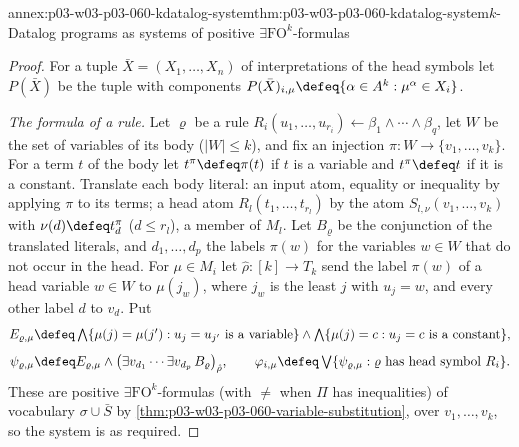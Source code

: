 \begin{annexitem}{annex:p03-w03-p03-060-kdatalog-system}{thm:p03-w03-p03-060-kdatalog-system}{\(k\)-Datalog programs as systems of positive \(\exists\mathrm{FO}^k\)-formulas}
\begin{proof}
For a tuple \(\bar X=(X_1,\ldots,X_n)\) of interpretations of the head
symbols let \(P(\bar X)\) be the tuple with components
\(P(\bar X)_{i,\mu}\defeq\{\alpha\in A^k:\mu^\alpha\in X_i\}\).

\emph{The formula of a rule.} Let \(\varrho\) be a rule
\(R_i(u_1,\ldots,u_{r_i})\leftarrow\beta_1\wedge\cdots\wedge\beta_q\), let
\(W\) be the set of variables of its body (\(|W|\le k\)), and fix an
injection \(\pi\colon W\to\{v_1,\ldots,v_k\}\). For a term \(t\) of the
body let \(t^\pi\defeq\pi(t)\) if \(t\) is a variable and \(t^\pi\defeq t\)
if it is a constant. Translate each body literal: an input atom, equality
or inequality by applying \(\pi\) to its terms; a head atom
\(R_l(t_1,\ldots,t_{r_l})\) by the atom \(S_{l,\nu}(v_1,\ldots,v_k)\) with
\(\nu(d)\defeq t_d^\pi\) (\(d\le r_l\)), a member of \(M_l\). Let
\(B_\varrho\) be the conjunction of the translated literals, and
\(d_1,\ldots,d_p\) the labels \(\pi(w)\) for the variables \(w\in W\) that
do not occur in the head. For \(\mu\in M_i\) let \(\hat\rho\colon[k]\to T_k\)
send the label \(\pi(w)\) of a head variable \(w\in W\) to \(\mu(j_w)\),
where \(j_w\) is the least \(j\) with \(u_j=w\), and every other label
\(d\) to \(v_d\). Put
\[
 E_{\varrho,\mu}\defeq\textstyle\bigwedge\{\mu(j)=\mu(j'):u_j=u_{j'}\text{ is a variable}\}\wedge\bigwedge\{\mu(j)=c:u_j=c\text{ is a constant}\},
\]
\[
 \psi_{\varrho,\mu}\defeq E_{\varrho,\mu}\wedge\bigl(\exists v_{d_1}\cdots\exists v_{d_p}\,B_\varrho\bigr)_{\hat\rho},
 \qquad
 \varphi_{i,\mu}\defeq\textstyle\bigvee\{\psi_{\varrho,\mu}:\varrho\text{ has head symbol }R_i\}.
\]
These are positive \(\exists\mathrm{FO}^k\)-formulas (with \(\neq\) when
\(\Pi\) has inequalities) of vocabulary \(\sigma\cup\bar S\) by
\cref{thm:p03-w03-p03-060-variable-substitution}, over
\(v_1,\ldots,v_k\), so the system is as required.


\end{proof}
\end{annexitem}
